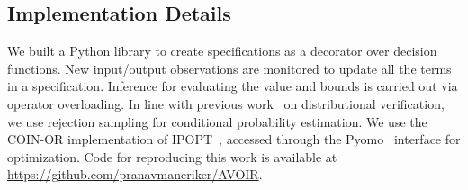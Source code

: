 \subsection{Implementation Details}
We built a Python library to create specifications as a decorator over decision functions. 
New input/output observations are monitored to update all the terms in a specification.
Inference for evaluating the value and bounds is carried out via operator overloading.%
In line with previous work~\citep{albarghouthi2017fairsquare,bastani2019probabilistic,albarghouthi2019fairness} on distributional verification, we use rejection sampling for conditional probability estimation.
We use the COIN-OR implementation of IPOPT~\citep{wachter2006implementation}, accessed through the Pyomo~\citep{hart2011pyomo} interface for optimization. Code for reproducing this work is available at \href{https://github.com/pranavmaneriker/AVOIR}{https://github.com/pranavmaneriker/AVOIR}.
